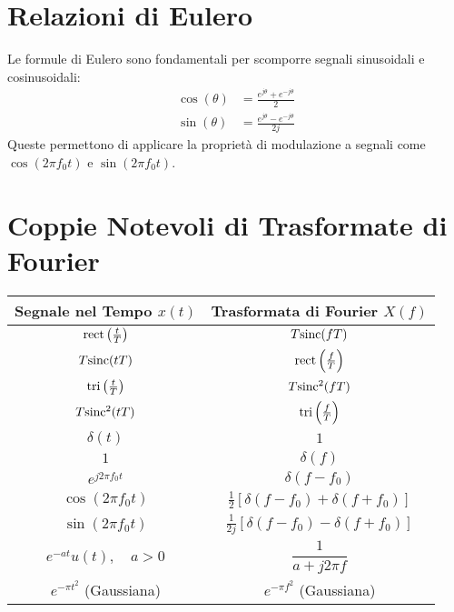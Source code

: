\section{Relazioni di Eulero}
Le formule di Eulero sono fondamentali per scomporre segnali sinusoidali e cosinusoidali:
\begin{align*}
    \cos(\theta) &= \frac{e^{j\theta} + e^{-j\theta}}{2} \\
    \sin(\theta) &= \frac{e^{j\theta} - e^{-j\theta}}{2j}
\end{align*}
Queste permettono di applicare la proprietà di modulazione a segnali come $\cos(2\pi f_0 t)$ e $\sin(2\pi f_0 t)$.

\section{Coppie Notevoli di Trasformate di Fourier}

\begin{center}
\begin{tabular}{c c}
    \toprule
    \textbf{Segnale nel Tempo $x(t)$} & \textbf{Trasformata di Fourier $X(f)$} \\
    \midrule
    $\text{rect}\left(\frac{t}{T}\right)$ & $T \text{sinc}(fT)$ \\
    \addlinespace
    $T \text{sinc}(tT)$ & $\text{rect}\left(\frac{f}{T}\right)$ \\
    \addlinespace
    $\text{tri}\left(\frac{t}{T}\right)$ & $T \text{sinc}^2(fT)$ \\
    \addlinespace
    $T \text{sinc}^2(tT)$ & $\text{tri}\left(\frac{f}{T}\right)$ \\
    \addlinespace
    $\delta(t)$ & $1$ \\
    \addlinespace
    $1$ & $\delta(f)$ \\
    \addlinespace
    $e^{j2\pi f_0 t}$ & $\delta(f - f_0)$ \\
    \addlinespace
    $\cos(2\pi f_0 t)$ & $\frac{1}{2}\left[\delta(f - f_0) + \delta(f + f_0)\right]$ \\
    \addlinespace
    $\sin(2\pi f_0 t)$ & $\frac{1}{2j}\left[\delta(f - f_0) - \delta(f + f_0)\right]$ \\
    \addlinespace
    $e^{-at} u(t), \quad a>0$ & $\dfrac{1}{a + j2\pi f}$ \\
    \addlinespace
    $e^{-\pi t^2}$ (Gaussiana) & $e^{-\pi f^2}$ (Gaussiana) \\
    \bottomrule
\end{tabular}
\end{center}

